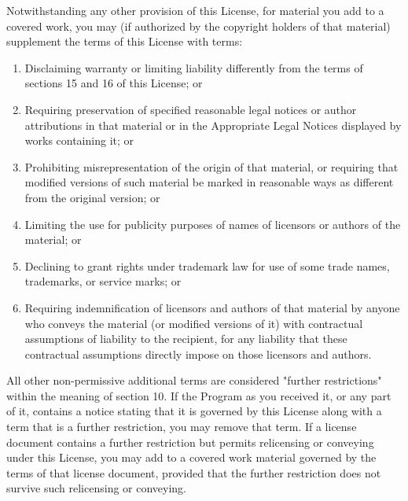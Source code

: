 \documentclass{ctexart}
\begin{document}
  Notwithstanding any other provision of this License, for material you
add to a covered work, you may (if authorized by the copyright holders of
that material) supplement the terms of this License with terms:
\begin{enumerate}
\renewcommand\theenumiP{\roman{enumi}}
    
  \item  Disclaiming warranty or limiting liability differently from the
    terms of sections 15 and 16 of this License; or

   
  \item Requiring preservation of specified reasonable legal notices or
    author attributions in that material or in the Appropriate Legal
    Notices displayed by works containing it; or

  
  \item  Prohibiting misrepresentation of the origin of that material, or
    requiring that modified versions of such material be marked in
    reasonable ways as different from the original version; or

   
  \item  Limiting the use for publicity purposes of names of licensors or
    authors of the material; or

  
  \item  Declining to grant rights under trademark law for use of some
    trade names, trademarks, or service marks; or

   
  \item  Requiring indemnification of licensors and authors of that
    material by anyone who conveys the material (or modified versions of
    it) with contractual assumptions of liability to the recipient, for
    any liability that these contractual assumptions directly impose on
    those licensors and authors.
\end{enumerate}

  All other non-permissive additional terms are considered "further
restrictions" within the meaning of section 10.  If the Program as you
received it, or any part of it, contains a notice stating that it is
governed by this License along with a term that is a further
restriction, you may remove that term.  If a license document contains
a further restriction but permits relicensing or conveying under this
License, you may add to a covered work material governed by the terms
of that license document, provided that the further restriction does
not survive such relicensing or conveying.
\end{document}
